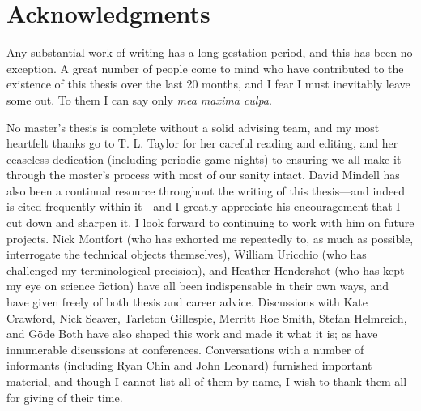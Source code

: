 
\cleardoublepage
\setcounter{savepage}{\thepage}
\begin{abstractpage}

\end{abstractpage}

% 

\cleardoublepage

\section*{Acknowledgments}

Any substantial work of writing has a long gestation period, and this
has been no exception. A great number of people come to mind who have
contributed to the existence of this thesis over the last 20 months,
and I fear I must 
inevitably leave some out. To them I can say only \emph{mea maxima culpa}. 

No master's thesis is complete without a
solid advising team, and my most heartfelt thanks go to T. L. Taylor
for her careful reading and editing, and her ceaseless dedication (including periodic
game nights) to ensuring we all make it through the master's process with most of our
sanity intact. David Mindell has also been a continual resource
throughout the writing of this thesis---and indeed is cited frequently
within it---and I greatly appreciate his encouragement that I cut down
and sharpen it. I look forward to continuing to work with him on
future projects. Nick Montfort (who has exhorted me repeatedly to, as
much as possible, interrogate the technical objects themselves),
William Uricchio (who has challenged my terminological precision),
and Heather Hendershot (who has kept my eye on science fiction) have all
been indispensable in their own ways, and have given freely of both
thesis and career advice. Discussions with Kate Crawford, Nick Seaver,
Tarleton Gillespie, Merritt Roe Smith, Stefan Helmreich, and G\"{o}de Both have also
shaped this work and made it what it is; as have innumerable
discussions at conferences. Conversations with a number of informants
(including Ryan Chin and John Leonard)
furnished important material, and though I cannot list all of them by
name, I wish to thank them all for giving of their time.

